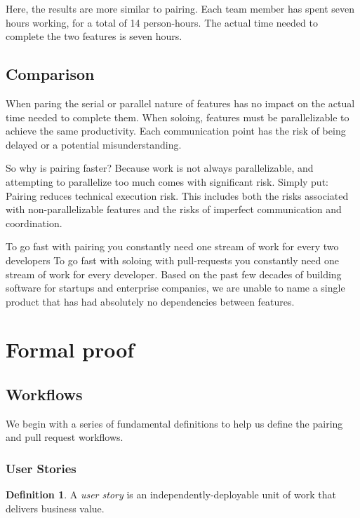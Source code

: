 \documentclass[letterpaper]{article}
\theoremstyle{definition}
\newtheorem{definition}[theorem]{Definition}
\begin{document}
    Here, the results are more similar to pairing.
    Each team member has spent seven hours working, for a total of 14 person-hours.
    The actual time needed to complete the two features is seven hours.

    \subsection{Comparison}\label{subsec:comparison}

    When paring the serial or parallel nature of features has no impact on the actual time needed to
    complete them.
    When soloing, features must be parallelizable to achieve the same productivity.
    Each communication point has the risk of being delayed or a potential misunderstanding.

    So why is pairing faster?
    Because work is not always parallelizable, and attempting to parallelize too much comes with significant risk.
    Simply put: Pairing reduces technical execution risk.
    This includes both the risks associated with non-parallelizable features and the risks of imperfect communication
    and coordination.

    To go fast with pairing you constantly need one stream of work for every two developers
    To go fast with soloing with pull-requests you constantly need one stream of work for every developer.
    Based on the past few decades of building software for startups and enterprise companies, we are unable to name a
    single product that has had absolutely no dependencies between features.

    \section{Formal proof}\label{sec:formal-proof}

    \subsection{Workflows}\label{subsec:workflows}

    We begin with a series of fundamental definitions to help us define the pairing and pull request workflows.

    \subsubsection{User Stories}\label{subsubsec:user-stories}

    \begin{definition}
        A \textit{user story} is an independently-deployable unit of work that delivers business value.
    \end{definition}
\end{document}
